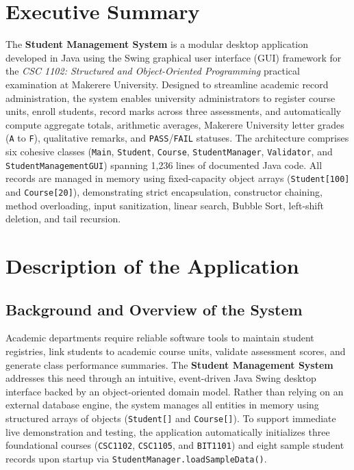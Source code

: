 \documentclass[10pt,a4paper]{article}
\begin{document}
\clearpage
{}
\setcounter{page}{1}

\section*{Executive Summary}
{\small
The \textbf{Student Management System} is a modular desktop application developed in Java using the Swing graphical user interface (GUI) framework for the \textit{CSC 1102: Structured and Object-Oriented Programming} practical examination at Makerere University. Designed to streamline academic record administration, the system enables university administrators to register course units, enroll students, record marks across three assessments, and automatically compute aggregate totals, arithmetic averages, Makerere University letter grades (\texttt{A} to \texttt{F}), qualitative remarks, and \texttt{PASS}/\texttt{FAIL} statuses. The architecture comprises six cohesive classes (\texttt{Main}, \texttt{Student}, \texttt{Course}, \texttt{StudentManager}, \texttt{Validator}, and \texttt{StudentManagementGUI}) spanning 1,236 lines of documented Java code. All records are managed in memory using fixed-capacity object arrays (\texttt{Student[100]} and \texttt{Course[20]}), demonstrating strict encapsulation, constructor chaining, method overloading, input sanitization, linear search, Bubble Sort, left-shift deletion, and tail recursion.\par}

\vspace{-0.12cm}
{\footnotesize\setlength{\parskip}{0pt}
\tableofcontents}
\vspace{0.1cm}

\section{Description of the Application}

\subsection{Background and Overview of the System}
Academic departments require reliable software tools to maintain student registries, link students to academic course units, validate assessment scores, and generate class performance summaries. The \textbf{Student Management System} addresses this need through an intuitive, event-driven Java Swing desktop interface backed by an object-oriented domain model. Rather than relying on an external database engine, the system manages all entities in memory using structured arrays of objects (\texttt{Student[]} and \texttt{Course[]}). To support immediate live demonstration and testing, the application automatically initializes three foundational courses (\texttt{CSC1102}, \texttt{CSC1105}, and \texttt{BIT1101}) and eight sample student records upon startup via \texttt{StudentManager.loadSampleData()}.
\end{document}
